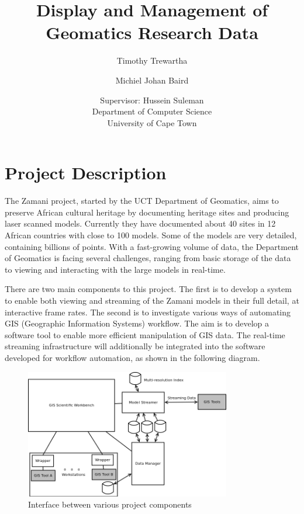 \documentclass[12pt,a4paper]{article}
\begin{document}
\author{Timothy Trewartha \\
\and
Michiel Johan Baird \\
\and
Supervisor: Hussein Suleman \\
Department of Computer Science \\
University of Cape Town
 }
\title{Display and Management of Geomatics Research Data}
\maketitle

\section{Project Description}
The Zamani project, started by the UCT Department of Geomatics, aims to
preserve African cultural heritage by documenting heritage sites and producing
laser scanned models. Currently they have documented about 40 sites in 12 African
countries with close to 100 models. Some of the models are very detailed, containing
billions of points. With a fast-growing volume of data, the Department of Geomatics
is facing several challenges, ranging from basic storage of the data to viewing and
interacting with the large models in real-time.

There are two main components to this project. The first is to develop a system to
enable both viewing and streaming of the Zamani models in their full detail, at
interactive frame rates. The second is to investigate various ways of automating
GIS (Geographic Information Systems) workflow. The aim is to develop a software tool
to enable more efficient manipulation of GIS data. The real-time streaming
infrastructure will additionally be integrated into the software developed for
workflow automation, as shown in the following diagram.
\begin{figure}[h!]
\centering
    \includegraphics[width=0.8\textwidth]{projectDiagram.png}
    \caption{Interface between various project components}
\end{figure}
\end{document}

